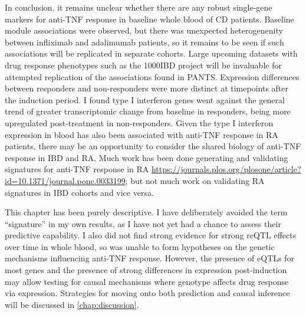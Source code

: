 In conclusion,
it remains unclear whether there are any robust single-gene markers for anti-\gls{TNF} response in baseline whole blood of \gls{CD} patients.
Baseline module associations were observed, but there was unexpected heterogenenity between infliximab and adalimumab patients,
so it remains to be seen if such associations will be replicated in separate cohorts.
Large upcoming datasets with drug response phenotypes such as the 1000IBD project \autocite{imhann20191000IBDProjectMultiomics} will be invaluable for attempted replication of the associations found in \gls{PANTS}.
Expression differences between responders and non-responders were more distinct at timepoints after the induction period.
I found type I interferon genes went against the general trend of greater transcriptomic change from baseline in responders,
being more upregulated post-treatment in non-responders.
Given the type I interferon expression in blood has also been associated with anti-\gls{TNF} response in \gls{RA} patients,
there may be an opportunity to consider the shared biology of anti-\gls{TNF} response in \gls{IBD} and \gls{RA}.
Much work has been done generating and validating signatures for anti-\gls{TNF} response in \gls{RA} \url{https://journals.plos.org/plosone/article?id=10.1371/journal.pone.0033199}; but not much work on validating \gls{RA} signatures in \gls{IBD} cohorts and vice versa.

This chapter has been purely descriptive.
I have deliberately avoided the term \enquote{signature} in my own results, 
as I have not yet had a chance to assess their predictive capability.
I also did not find strong evidence for strong \gls{reQTL} effects over time in whole blood, 
so was unable to form hypotheses on the genetic mechanisms influencing anti-\gls{TNF} response.
However, the presence of \glspl{eQTL} for most genes and the presence of strong differences in expression post-induction may allow testing for causal mechanisms where genotype affects drug response via expression.
Strategies for moving onto both prediction and causal inference will be discussed in \autoref{chap:discussion}.



